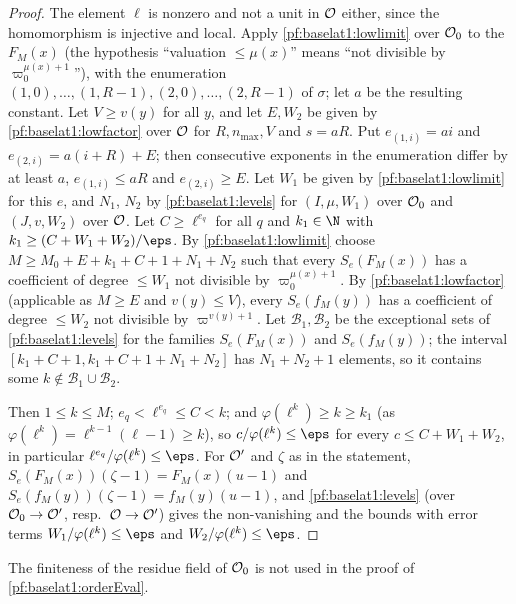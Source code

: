 \begin{proof}
The element $\ell$ is nonzero and not a unit in $\mathcal O$ either, since the homomorphism is injective and local. Apply
\cref{pf:baselat1:lowlimit} over $\mathcal O_0$ to the $F_M(x)$ (the hypothesis ``valuation $\le\mu(x)$'' means
``not divisible by $\varpi_0^{\mu(x)+1}$''), with the enumeration $(1,0),\dots,(1,R-1),(2,0),\dots,(2,R-1)$ of $\sigma$; let
$a$ be the resulting constant. Let $V\ge v(y)$ for all $y$, and let $E,W_2$ be given by \cref{pf:baselat1:lowfactor} over
$\mathcal O$ for $R,n_{\max},V$ and $s=aR$. Put $e_{(1,i)}=ai$ and $e_{(2,i)}=a(i+R)+E$; then consecutive exponents in the
enumeration differ by at least $a$, $e_{(1,i)}\le aR$ and $e_{(2,i)}\ge E$. Let $W_1$ be given by \cref{pf:baselat1:lowlimit}
for this $e$, and $N_1$, $N_2$ by \cref{pf:baselat1:levels} for $(I,\mu,W_1)$ over $\mathcal O_0$ and $(J,v,W_2)$ over
$\mathcal O$. Let $C\ge\ell^{e_q}$ for all $q$ and $k_1\in\N$ with $k_1\ge(C+W_1+W_2)/\eps$. By \cref{pf:baselat1:lowlimit}
choose $M\ge M_0+E+k_1+C+1+N_1+N_2$ such that every $S_e(F_M(x))$ has a coefficient of degree $\le W_1$ not divisible by
$\varpi_0^{\mu(x)+1}$. By \cref{pf:baselat1:lowfactor} (applicable as $M\ge E$ and $v(y)\le V$), every $S_e(f_M(y))$ has a
coefficient of degree $\le W_2$ not divisible by $\varpi^{v(y)+1}$. Let $\mathcal B_1,\mathcal B_2$ be the exceptional sets of
\cref{pf:baselat1:levels} for the families $S_e(F_M(x))$ and $S_e(f_M(y))$; the interval $[k_1+C+1,k_1+C+1+N_1+N_2]$ has
$N_1+N_2+1$ elements, so it contains some $k\notin\mathcal B_1\cup\mathcal B_2$.

Then $1\le k\le M$; $e_q<\ell^{e_q}\le C<k$; and $\varphi(\ell^k)\ge k\ge k_1$ (as $\varphi(\ell^k)=\ell^{k-1}(\ell-1)\ge k$),
so $c/\varphi(\ell^k)\le\eps$ for every $c\le C+W_1+W_2$, in particular $\ell^{e_q}/\varphi(\ell^k)\le\eps$. For $\mathcal O'$
and $\zeta$ as in the statement, $S_e(F_M(x))(\zeta-1)=F_M(x)(u-1)$ and $S_e(f_M(y))(\zeta-1)=f_M(y)(u-1)$, and
\cref{pf:baselat1:levels} (over $\mathcal O_0\to\mathcal O'$, resp.\ $\mathcal O\to\mathcal O'$) gives the
non-vanishing and the bounds with error terms $W_1/\varphi(\ell^k)\le\eps$ and $W_2/\varphi(\ell^k)\le\eps$.
\end{proof}

\begin{remark}\label{pf:baselat1:rem:finres}
The finiteness of the residue field of $\mathcal O_0$ is not used in the proof of \cref{pf:baselat1:orderEval}.
\end{remark}

